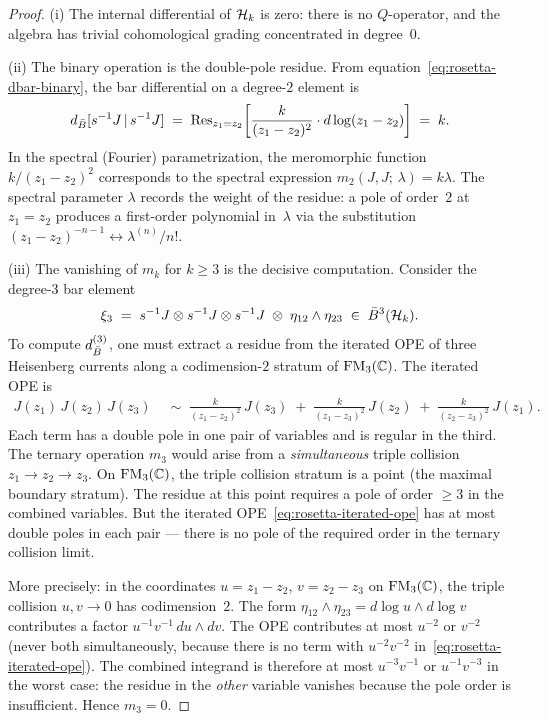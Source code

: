 \begin{proof}
(i) The internal differential of $\mathcal{H}_k$ is zero: there is no
$Q$-operator, and the algebra has trivial cohomological grading
concentrated in degree~$0$.

\smallskip
(ii) The binary operation is the double-pole residue.  From
equation~\eqref{eq:rosetta-dbar-binary}, the bar differential
on a degree-$2$ element is
\[
d_{\bar{B}}[s^{-1}J \,|\, s^{-1}J]
\;=\;
\operatorname{Res}_{z_1 = z_2}\!\left[
  \frac{k}{(z_1 - z_2)^2}
  \cdot d\log(z_1 - z_2)
\right]
\;=\; k.
\]
In the spectral (Fourier) parametrization, the meromorphic function
$k/(z_1 - z_2)^2$ corresponds to the spectral expression
$m_2(J, J;\, \lambda) = k\lambda$.  The spectral parameter
$\lambda$ records the weight of the residue: a pole of order~$2$
at $z_1 = z_2$ produces a first-order polynomial in~$\lambda$
via the substitution $(z_1 - z_2)^{-n-1} \leftrightarrow
\lambda^{(n)}/n!$.

\smallskip
(iii) The vanishing of $m_k$ for $k \geq 3$ is the decisive
computation.  Consider the degree-$3$ bar element
\[
\xi_3
\;=\;
s^{-1}J \otimes s^{-1}J \otimes s^{-1}J
\;\otimes\;
\eta_{12} \wedge \eta_{23}
\;\in\;
\bar{B}^3(\mathcal{H}_k).
\]
To compute $d_{\bar{B}}^{(3)}$, one must extract a residue
from the iterated OPE of three Heisenberg currents along a
codimension-$2$ stratum of $\mathrm{FM}_3(\mathbb{C})$.  The iterated OPE is
\begin{align}\label{eq:rosetta-iterated-ope}
J(z_1)\, J(z_2)\, J(z_3)
&\;\sim\;
\frac{k}{(z_1 - z_2)^2}\, J(z_3)
\;+\;
\frac{k}{(z_1 - z_3)^2}\, J(z_2)
\;+\;
\frac{k}{(z_2 - z_3)^2}\, J(z_1).
\end{align}
Each term has a double pole in one pair of variables and is
regular in the third.  The ternary operation $m_3$ would arise
from a \emph{simultaneous} triple collision $z_1 \to z_2 \to z_3$.
On $\mathrm{FM}_3(\mathbb{C})$, the triple collision stratum is a point
(the maximal boundary stratum).  The residue at this point requires
a pole of order $\geq 3$ in the combined variables.  But the
iterated OPE~\eqref{eq:rosetta-iterated-ope} has at most
double poles in each pair --- there is no pole of the required
order in the ternary collision limit.

More precisely: in the coordinates $u = z_1 - z_2$,
$v = z_2 - z_3$ on $\mathrm{FM}_3(\mathbb{C})$, the triple collision
$u, v \to 0$ has codimension~$2$.  The form
$\eta_{12} \wedge \eta_{23} = d\log u \wedge d\log v$
contributes a factor $u^{-1}v^{-1}\, du \wedge dv$.  The
OPE contributes at most $u^{-2}$ or $v^{-2}$ (never both
simultaneously, because there is no term with $u^{-2}v^{-2}$
in~\eqref{eq:rosetta-iterated-ope}).  The combined integrand
is therefore at most $u^{-3}v^{-1}$ or $u^{-1}v^{-3}$ in
the worst case: the residue in the \emph{other} variable
vanishes because the pole order is insufficient.  Hence
$m_3 = 0$.


\end{proof}
